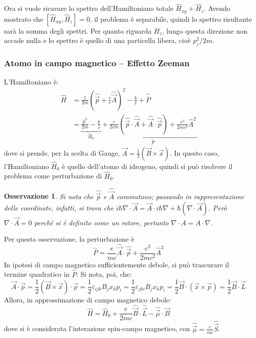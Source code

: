 \documentclass[11pt, a4paper]{scrartcl} %
\numberwithin{equation}{subsection}
\theoremstyle{style2}
\newtheorem{osservazione}{Osservazione}[section]
\theoremstyle{style1}
\begin{document}
\vspace{.5cm}
Ora si vuole ricavare lo spettro dell'Hamiltoniano totale $\hat{H}_{xy} + \hat{H}_z$.
Avendo mostrato che $[\hat{H}_{xy} , \hat{H}_z] = 0$, il problema \`e separabile, quindi lo spettro risultante sar\`a la somma degli spettri. 
Per quanto riguarda $\hat{H}_z$, lungo questa direzione non accade nulla e lo spettro \`e quello di una particella libera, cio\`e $p^2_z / 2m$.
\subsubsection{Atomo in campo magnetico -- Effetto Zeeman}
L'Hamiltoniano \`e:
\begin{equation}
	\begin{split}
		\hat{H} &= \frac{1}{2m} \left(\hat{\vec{p}} + \frac{e}{c}\hat{\vec{A}}\right) ^2 - \frac{k}{\hat{r}} + \hat{\overline{P}} \\
			&= \underbracket{\frac{\hat{p}^2}{2m} - \frac{k}{\hat{r}}}_{\hat{H}_0}  + \underbracket{\frac{e}{2cm}\left(\hat{\vec{p}} \cdot \hat{\vec{A}}+ \hat{\vec{A}}\cdot \hat{\vec{p}}\right) + \frac{e^2}{2mc^2} \hat{A}^2}_{\hat{P}} 
	\end{split}
\end{equation}
dove si prende, per la scelta di Gauge, $\vec{A} = \frac{1}{2} \left(\vec{B}\times \vec{x}\right) $.
In questo caso, l'Hamiltoniano $\hat{H}_0$ \`e quello dell'atomo di idrogeno, quindi si pu\`o risolvere il problema come perturbazione di $\hat{H}_0$.
\begin{osservazione}
Si nota che $\hat{\vec{p}}$ e $\hat{\vec{A}}$ commutano; passando in rappresentazione delle coordinate, infatti, si trova che $i \hbar  \nabla \cdot \vec{A} = \vec{A} \cdot i \hbar  \nabla + \hbar  (\nabla \cdot \vec{A})$.
Per\`o $\nabla \cdot \vec{A} = 0$ perch\'e si \`e definito come un rotore, pertanto $\nabla \cdot A = A \cdot \nabla $.
\end{osservazione}
\noindent Per questa osservazione, la perturbazione \`e
\begin{equation}
	\hat{P} = \frac{e}{mc}\hat{\vec{A}}\cdot \hat{\vec{p}} + \frac{e^2}{2mc^2}\hat{A}^2
\end{equation}
In ipotesi di campo magnetico sufficientemente debole, si pu\`o trascurare il termine quadratico in $\hat{P}$.
Si nota, poi, che:
\[
\vec{A}\cdot \vec{p} =\frac{1}{2} (\vec{B}\times \vec{x}) \cdot \vec{p} = \frac{1}{2} \varepsilon _{ijk} B_j x_k p_i = \frac{1}{2} \varepsilon _{jki} B_j x_k p_i= \frac{1}{2} \vec{B}\cdot (\vec{x}\times \vec{p}) = \frac{1}{2}\vec{B}\cdot \vec{L}
\] 
Allora, in approssimazione di campo magnetico debole:
\begin{equation}
	\hat{H} = \hat{H}_0 + \frac{e}{2mc} \hat{\vec{B}} \cdot \hat{\vec{L}} -\hat{ \vec{\mu }} \cdot \vec{B}
\end{equation}
dove si \`e considerata l'interazione spin-campo magnetico, con $\hat{\vec{\mu }} = \frac{e}{mc}\hat{\vec{S}}$.
\end{document}
